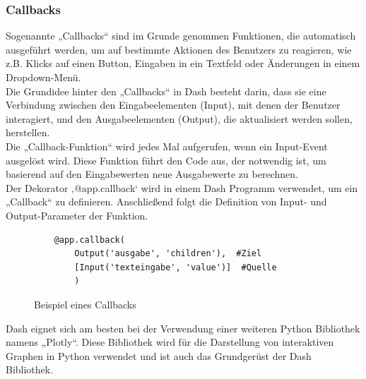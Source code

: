 \subsubsection{Callbacks }\label{sec:Callback}
Sogenannte „Callbacks“ sind im Grunde genommen Funktionen, die automatisch ausgeführt werden, um auf bestimmte Aktionen des Benutzers zu reagieren, wie z.B. Klicks auf einen Button, Eingaben in ein Textfeld oder Änderungen in einem Dropdown-Menü.\\
\vspace{3mm}
Die Grundidee hinter den „Callbacks“ in Dash besteht darin, dass sie eine Verbindung zwischen den Eingabeelementen (Input), mit denen der Benutzer interagiert, und den Ausgabeelementen (Output), die aktualisiert werden sollen, herstellen.\\
\vspace{3mm}
Die „Callback-Funktion“ wird jedes Mal aufgerufen, wenn ein Input-Event ausgelöst wird. Diese Funktion führt den Code aus, der notwendig ist, um basierend auf den Eingabewerten neue Ausgabewerte zu berechnen.\\
\vspace{3mm}
Der Dekorator ‚@app.callback‘  wird  in einem Dash Programm verwendet, um ein „Callback“ zu definieren. Anschließend folgt die Definition von Input- und Output-Parameter der Funktion.\\
\vspace{3mm}
\begin{figure}[H]
    \centering
    \begin{verbatim}
    @app.callback(
		Output('ausgabe', 'children'),  #Ziel
		[Input('texteingabe', 'value')]  #Quelle
		)
    \end{verbatim}
    \caption{Beispiel eines Callbacks}
\end{figure}
Dash eignet sich am besten bei der Verwendung einer weiteren Python Bibliothek namens „Plotly“. Diese Bibliothek wird für die Darstellung von interaktiven Graphen in Python verwendet und ist auch das Grundgerüst der Dash Bibliothek.


